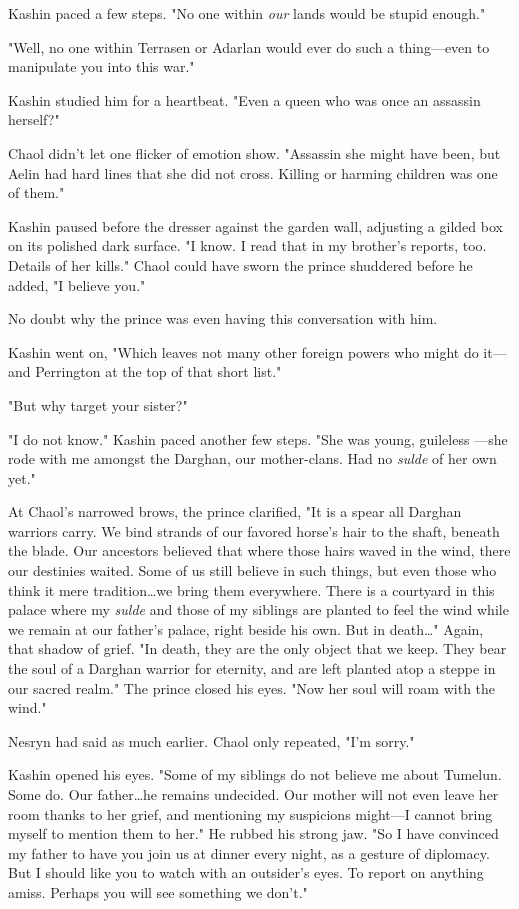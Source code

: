 Kashin paced a few steps.
"No one within \emph{our} lands would be stupid enough."

"Well, no one within Terrasen or Adarlan would ever do such a thing---even to manipulate you into this war."

Kashin studied him for a heartbeat.
"Even a queen who was once an assassin herself?"

Chaol didn't let one flicker of emotion show.
"Assassin she might have been, but Aelin had hard lines that she did not cross.
Killing or harming children was one of them."

Kashin paused before the dresser against the garden wall, adjusting a gilded box on its polished dark surface.
"I know.
I read that in my brother's reports, too.
Details of her kills."
Chaol could have sworn the prince shuddered before he added, "I believe you."

No doubt why the prince was even having this conversation with him.

Kashin went on, "Which leaves not many other foreign powers who might do it---and Perrington at the top of that short list."

"But why target your sister?"

"I do not know."
Kashin paced another few steps.
"She was young, guileless ---she rode with me amongst the Darghan, our mother-clans.
Had no \emph{sulde} of her own yet."

At Chaol's narrowed brows, the prince clarified, "It is a spear all Darghan warriors carry.
We bind strands of our favored horse's hair to the shaft, beneath the blade.
Our ancestors believed that where those hairs waved in the wind, there our destinies waited.
Some of us still believe in such things, but even those who think it mere tradition\ldots we bring them everywhere.
There is a courtyard in this palace where my \emph{sulde} and those of my siblings are planted to feel the wind while we remain at our father's palace, right beside his own.
But in death\ldots" Again, that shadow of grief.
"In death, they are the only object that we keep.
They bear the soul of a Darghan warrior for eternity, and are left planted atop a steppe in our sacred realm."
The prince closed his eyes.
"Now her soul will roam with the wind."

Nesryn had said as much earlier.
Chaol only repeated, "I'm sorry."

Kashin opened his eyes.
"Some of my siblings do not believe me about Tumelun.
Some do.
Our father\ldots he remains undecided.
Our mother will not even leave her room thanks to her grief, and mentioning my suspicions might---I cannot bring myself to mention them to her."
He rubbed his strong jaw.
"So I have convinced my father to have you join us at dinner every night, as a gesture of diplomacy.
But I should like you to watch with an outsider's eyes.
To report on anything amiss.
Perhaps you will see something we don't."


